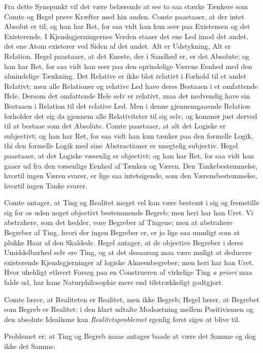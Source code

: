 \documentclass[12pt]{article}
\newcommand{\opage}[1]{\marginnote{\footnotesize\textit{[#1]}}}
\begin{document}
Fra dette Synspunkt vil det være belærende at see to saa
stærke Tænkere som Comte og Hegel prøve Kræfter med hin\-%
\opage{30}anden. Comte paastaaer, at der intet Absolut er til; og han
har Ret, for saa vidt han kun seer paa Existensen og det
Existerende. I Kjendsgjerningernes Verden staaer det ene Led
imod det andet, det ene Atom existerer ved Siden af det andet.
Alt er Udstykning, Alt er Relation. Hegel paastaaer, at det
Eneste, der i Sandhed er, er det Absolute; og han har Ret, for
saa vidt han seer paa den oprindelige Værens Eenhed med den
almindelige Tænkning. Det Relative er ikke blot relativt i
Forhold til et andet Relativt; men alle Relationer og relative Led
have deres Bestaaen i et omfattende Hele. Dersom det
omfattende Hele selv er relativt, maa det nødvendig have sin
Bestaaen i Relation til det relative Led. Men i denne
gjennemgaaende Relation forholder det sig da gjennem alle Relativiteter
til sig selv, og kommer just derved til at bestaae som det
Absolute. Comte paastaaer, at alt det Logiske er subjectivt; og
han har Ret, for saa vidt han kun tænker paa den formelle
Logik, thi den formelle Logik med sine Abstractioner er
unegtelig subjectiv. Hegel paastaaer, at det Logiske væsenlig er
objectivt; og han har Ret, for saa vidt han gaaer ud fra den
væsenlige Eenhed af Tænken og Væren. Den Tankebestemmelse,
hvortil ingen Væren svarer, er lige saa intetsigende, som den
Værensbestemmelse, hvortil ingen Tanke svarer.

Comte antager, at Ting og Realitet meget vel kan være
bestemt i sig og fremstille sig for os uden noget objectivt
bestemmende Begreb; men heri har han Uret. Vi abstrahere, som
det hedder, vore Begreber af Tingene; men at abstrahere
Begreber af Ting, hvori der ingen Begreber er, er jo lige saa
umuligt som at plukke Haar af den Skaldede. Hegel antager, at
de objective Begreber i deres Umiddelbarhed selv ere Ting, og
at det desaarsag maa være muligt at deducere existerende
Kjendsgjerninger af logiske Almeenbegreber; men heri har han Uret.
Hvor uheldigt ethvert Forsøg paa en Construeren af virkelige
Ting \textit{a priori} maa falde ud, har hans Naturphilosophie mere end
tilstrækkeligt godtgjort.

Comte lærer, at Realiteten er Realitet, men ikke Begreb;
Hegel lærer, at Begrebet som Begreb er Realitet: i den klart
\opage{31} udtalte Modsætning mellem Positivismen og den absolute
Idealisme kan \emph{Realitetsproblemet} egenlig først siges at
blive til.

Problemet er: at Ting og Begreb maae antages baade at
være det Samme og dog ikke det Samme.
\end{document}
